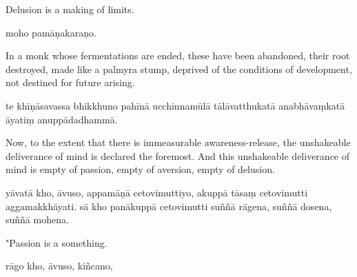 \begin{samepage}
\begin{leftcolumn*}
Delusion is a making of limits.
\end{leftcolumn*}

\begin{rightcolumn}
moho pamāṇakaraṇo.
\end{rightcolumn}
\end{samepage}

\begin{samepage}
\begin{leftcolumn*}
In a monk whose fermentations are ended, these have been abandoned, their root destroyed, made like a palmyra stump, deprived of the conditions of development, not destined for future arising.
\end{leftcolumn*}

\begin{rightcolumn}
te khīṇāsavassa bhikkhuno pahīnā ucchinnamūlā tālāvatthukatā anabhāvaṃkatā āyatiṃ anuppādadhammā.
\end{rightcolumn}
\end{samepage}

\begin{samepage}
\begin{leftcolumn*}
Now, to the extent that there is immeasurable awareness-release, the unshakeable deliverance of mind is declared the foremost.
And this unshakeable deliverance of mind is empty of passion, empty of aversion, empty of delusion.
\end{leftcolumn*}

\begin{rightcolumn}
yāvatā kho, āvuso, appamāṇā cetovimuttiyo, akuppā tāsaṃ cetovimutti aggamakkhāyati.
sā kho panākuppā cetovimutti suññā rāgena, suññā dosena, suññā mohena.
\end{rightcolumn}
\end{samepage}

\begin{samepage}
\begin{leftcolumn*}
"Passion is a something.
\end{leftcolumn*}

\begin{rightcolumn}
rāgo kho, āvuso, kiñcano,
\end{rightcolumn}
\end{samepage}

